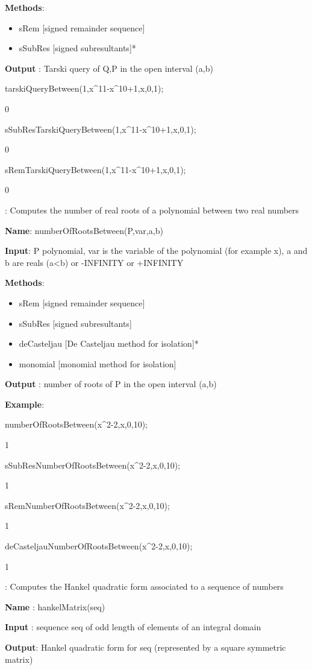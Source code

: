 \documentclass{article}
\begin{document}
{{\bf  Methods}:
  \begin{itemize}
    \item sRem [signed remainder sequence]
    \item sSubRes [signed subresultants]*
  \end{itemize}
  
{\bf Output} : Tarski query of Q,P in the open interval (a,b)
  
tarskiQueryBetween(1,x\^{}11-x\^{}10+1,x,0,1);

 0
 
 sSubResTarskiQueryBetween(1,x\^{}11-x\^{}10+1,x,0,1);
 
 0
 
 sRemTarskiQueryBetween(1,x\^{}11-x\^{}10+1,x,0,1);
 
 0
  



:
  Computes the number of real roots of a polynomial between two real numbers
  
{\bf Name}: numberOfRootsBetween(P,var,a,b)
  
{\bf  Input}: P polynomial, var is the variable of the polynomial (for example x), a and b are reals (a<b) or -INFINITY or +INFINITY
  
{\bf Methods}:
  \begin{itemize}
    \item sRem [signed remainder sequence]
    \item sSubRes [signed subresultants]
    \item deCasteljau [De Casteljau method for isolation]*
    \item {\color{grey} monomial [monomial method for isolation]}
  \end{itemize}
 
 {\bf Output} : number of roots of P in the open interval (a,b)
  
{\bf Example}: 

numberOfRootsBetween(x\^{}2-2,x,0,10);

 1
 

sSubResNumberOfRootsBetween(x\^{}2-2,x,0,10);

1

sRemNumberOfRootsBetween(x\^{}2-2,x,0,10);

1

deCasteljauNumberOfRootsBetween(x\^{}2-2,x,0,10);

1
  
  
:
  Computes the Hankel quadratic form associated to a sequence of numbers
  
{\bf Name} : hankelMatrix(seq)
  
{\bf  Input} : sequence seq of odd length of elements of an integral domain
  
 {\bf Output}: Hankel quadratic form for seq (represented by a square symmetric
  matrix)}
  
\end{document}
